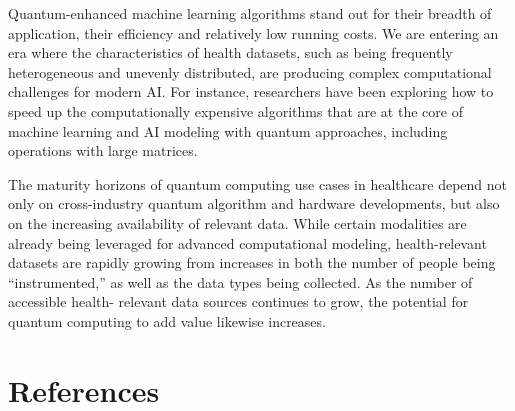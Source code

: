 \documentclass{scrartcl}
\begin{document}
Quantum-enhanced machine learning algorithms stand out for their breadth of application, their efficiency and relatively low running costs. We are entering an era where the characteristics of health datasets, such as being frequently heterogeneous and unevenly distributed, are producing complex computational challenges for modern AI. For instance, researchers have been exploring how to speed up the computationally expensive algorithms that are at the core of machine learning and AI modeling with quantum approaches, including operations with large matrices.

The maturity horizons of quantum computing use cases in healthcare depend not only on cross-industry quantum algorithm and hardware developments, but also on the increasing availability of relevant data. While certain modalities are already being leveraged for advanced computational modeling, health-relevant datasets are rapidly growing from increases in both the number of people being “instrumented,” as well as the data types being collected. As the number of accessible health- relevant data sources continues to grow, the potential for quantum computing to add value likewise increases.

\section{References}
\label{sec:org3c7375e}
\end{document}
